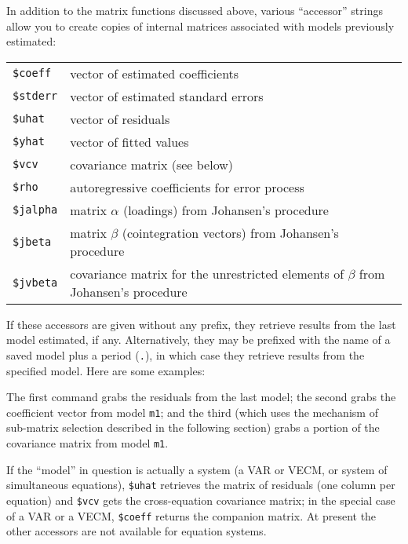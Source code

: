 In addition to the matrix functions discussed above,
various ``accessor'' strings allow you to create copies of internal
matrices associated with models previously estimated:

\begin{center}
\begin{tabular}{ll}
\texttt{\$coeff}  & vector of estimated coefficients \\
\texttt{\$stderr} & vector of estimated standard errors \\
\texttt{\$uhat}   & vector of residuals \\
\texttt{\$yhat}   & vector of fitted values \\
\texttt{\$vcv}    & covariance matrix (see below) \\
\texttt{\$rho}    & autoregressive coefficients for error process \\
\texttt{\$jalpha} & matrix $\alpha$ (loadings) from Johansen's procedure \\
\texttt{\$jbeta}  & matrix $\beta$ (cointegration vectors) from
Johansen's procedure \\
\texttt{\$jvbeta} & covariance matrix for the unrestricted elements of
$\beta$ from Johansen's procedure
\end{tabular}
\end{center}

If these accessors are given without any prefix, they retrieve results
from the last model estimated, if any.  Alternatively, they may be
prefixed with the name of a saved model plus a period (\texttt{.}), in
which case they retrieve results from the specified model.  Here are
some examples:
%
%
The first command grabs the residuals from the last model; the second
grabs the coefficient vector from model \texttt{m1}; and the third
(which uses the mechanism of sub-matrix selection described in the
following section) grabs a portion of the covariance matrix from model
\texttt{m1}.

If the ``model'' in question is actually a system (a VAR or VECM, or
system of simultaneous equations), \verb|$uhat| retrieves the
matrix of residuals (one column per equation) and \verb|$vcv| gets
the cross-equation covariance matrix; in the special case of a VAR or
a VECM, \verb|$coeff| returns the companion matrix. At present the
other accessors are not available for equation systems.

